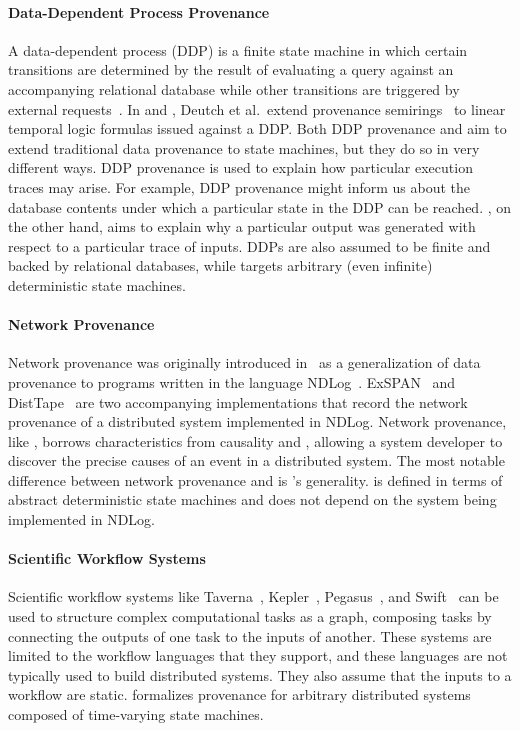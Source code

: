 \paragraph{Data-Dependent Process Provenance}
A data-dependent process (DDP) is a finite state machine in which certain
transitions are determined by the result of evaluating a query against an
accompanying relational database while other transitions are triggered by
external requests~\cite{deutch2014provenance, deutch2015provenance}. In
\cite{deutch2014provenance} and \cite{deutch2015provenance}, Deutch et al.\
extend provenance semirings~\cite{green2007provenance} to linear temporal logic
formulas issued against a DDP.
%
Both DDP provenance and \watprovenance{} aim to extend traditional data
provenance to state machines, but they do so in very different ways. DDP
provenance is used to explain how particular execution traces may arise. For
example, DDP provenance might inform us about the database contents under which
a particular state in the DDP can be reached. \Watprovenance{}, on the other
hand, aims to explain why a particular output was generated with respect to a
particular trace of inputs. DDPs are also assumed to be finite and backed by
relational databases, while \watprovenance{} targets arbitrary (even infinite)
deterministic state machines.

\paragraph{Network Provenance}
Network provenance was originally introduced in~\cite{zhou2010efficient} as a
generalization of data provenance to programs written in the  language
NDLog~\cite{loo2006design}. ExSPAN~\cite{zhou2010efficient} and
DistTape~\cite{zhou2012distributed} are two accompanying implementations that
record the network provenance of a distributed system implemented in NDLog.
Network provenance, like \watprovenance{}, borrows characteristics from
causality and \whyprovenance{}, allowing a system developer to discover the
precise causes of an event in a distributed system. The most notable difference
between network provenance and \watprovenance{} is \watprovenance{}'s
generality. \Watprovenance{} is defined in terms of abstract deterministic
state machines and does not depend on the system being implemented in NDLog.

\paragraph{Scientific Workflow Systems}
Scientific workflow systems like Taverna~\cite{wolstencroft2013taverna},
Kepler~\cite{altintas2006provenance}, Pegasus~\cite{kim2008provenance}, and
Swift~\cite{wozniak2013swift} can be used to structure complex computational
tasks as a graph, composing tasks by connecting the outputs of one task to the
inputs of another. These systems are limited to the workflow languages that
they support, and these languages are not typically used to build distributed
systems. They also assume that the inputs to a workflow are static.
\Watprovenance{} formalizes provenance for arbitrary distributed systems
composed of time-varying state machines.

